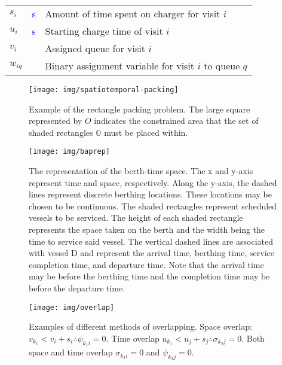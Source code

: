 \documentclass[utf8]{FrontiersinHarvard}
\begin{document}
\begin{table}[!htpb]
\begin{tabularx}{\textwidth}{l l l}
    $s_i$                    & \textcolor{blue}{s}     & Amount of time spent on charger for visit $i$                                                                     \\
    $u_i$                    & \textcolor{blue}{s}     & Starting charge time of visit $i$                                                                                 \\
    $v_i$                    &                         & Assigned queue for visit $i$                                                                                      \\
    $w_{iq}$                 &                         & Binary assignment variable for visit $i$ to queue $q$                                                             \\
    \bottomrule
  \end{tabularx}
\end{table}

\begin{figure}[htpb]
\centering
    \texttt{[image: img/spatiotemporal-packing]}
    \caption{Example of the rectangle packing problem. The large square represented by $O$ indicates the constrained
      area that the set of shaded rectangles $\mathbb{O}$ must be placed within.}
    \label{fig:packexample}
\end{figure}

\begin{figure}[ht]
\centering
    \texttt{[image: img/baprep]}
    \caption{The representation of the berth-time space. The x and y-axis represent time and space, respectively. Along
      the y-axis, the dashed lines represent discrete berthing locations. These locations may be chosen to be
      continuous. The shaded rectangles represent scheduled vessels to be serviced. The height of each shaded rectangle
      represents the space taken on the berth and the width being the time to service said vessel. The vertical dashed
      lines are associated with vessel D and represent the arrival time, berthing time, service completion time, and
      departure time. Note that the arrival time may be before the berthing time and the completion time may be before
      the departure time.}
    \label{fig:bap}
\end{figure}

\begin{figure}[htpb]
\centering
    \texttt{[image: img/overlap]}
    \caption{Examples of different methods of overlapping. Space overlap: $v_{k_1} < v_{i} + s_i \therefore \psi_{k_{1}i} = 0$.
             Time overlap $u_{k_1} < u_{j} + s_j \therefore \sigma_{k_{2}j} = 0$. Both space and time overlap $\sigma_{k_{3}i} = 0$ and
             $\psi_{k_{3}j} = 0$.}
    \label{fig:multipleassign}
\end{figure}
\end{document}
